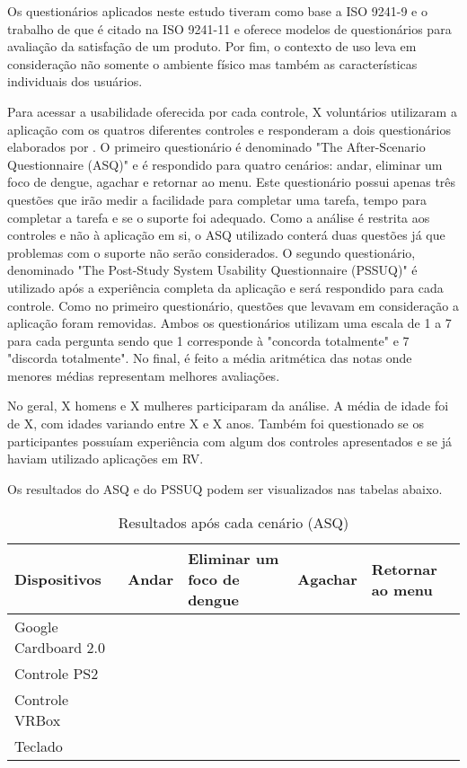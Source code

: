 Os questionários aplicados neste estudo tiveram como base a ISO 9241-9 e o trabalho de \cite{lewis} que é citado na ISO 9241-11 e oferece modelos de questionários para avaliação da satisfação de um produto. Por fim, o contexto de uso leva em consideração não somente o ambiente físico mas também as características individuais dos usuários. 

Para acessar a usabilidade oferecida por cada controle, X voluntários utilizaram a aplicação com os quatros diferentes controles e responderam a dois questionários elaborados por \cite{lewis}. O primeiro questionário é denominado "The After-Scenario Questionnaire (ASQ)" e é respondido para quatro cenários: andar, eliminar um foco de dengue, agachar e retornar ao menu. Este questionário possui apenas três questões que irão medir a facilidade para completar uma tarefa, tempo para completar a tarefa e se o suporte foi adequado. Como a análise é restrita aos controles e não à aplicação em si, o ASQ utilizado conterá duas questões já que problemas com o suporte não serão considerados. O segundo questionário, denominado "The Post-Study System Usability Questionnaire (PSSUQ)" é utilizado após a experiência completa da aplicação e será respondido para cada controle. Como no primeiro questionário, questões que levavam em consideração a aplicação foram removidas. Ambos os questionários utilizam uma escala de 1 a 7 para cada pergunta sendo que 1 corresponde à "concorda totalmente" e 7 "discorda totalmente". No final, é feito a média aritmética das notas onde menores médias representam melhores avaliações.  

No geral, X homens e X mulheres participaram da análise. A média de idade foi de X, com idades variando entre X e X anos. Também foi questionado se os participantes possuíam experiência com algum dos controles apresentados e se já haviam utilizado aplicações em RV. 

Os resultados do ASQ e do PSSUQ podem ser visualizados nas tabelas abaixo.

\begin{table}[H]	
	\caption{Resultados após cada cenário (ASQ)} 
	\label{t.ASQ} 
	\centering
	\begin{tabular}{l|l|l|l|l}
	\textbf{\small Dispositivos } & \textbf{\small Andar} & \textbf{\small Eliminar um foco de dengue} & \textbf{\small Agachar} & \textbf{\small Retornar ao menu} \\\hline
	
	{\small Google Cardboard 2.0} & {\small } & {\small } & {\small } & {\small } \\\hline	
	
	{\small Controle PS2} & {\small } & {\small } & {\small } & {\small } \\\hline		 
	
	{\small Controle VRBox} & {\small } & {\small } & {\small } & {\small } \\\hline  
	
	{\small Teclado} & {\small } & {\small } & {\small } & {\small } \\\hline	
	\end{tabular}
\end{table}

